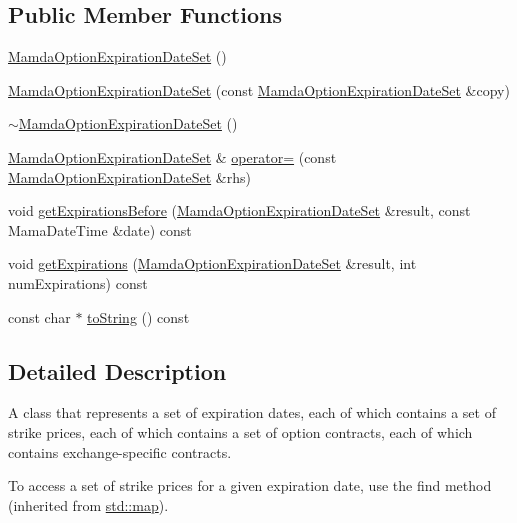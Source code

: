\subsection*{Public Member Functions}
\begin{CompactItemize}
\item 
\hyperlink{classWombat_1_1MamdaOptionExpirationDateSet_d4d423540db1d29fef11c563b451dc69}{Mamda\-Option\-Expiration\-Date\-Set} ()
\item 
\hyperlink{classWombat_1_1MamdaOptionExpirationDateSet_51ec0f5167345aab435049f011d31b4d}{Mamda\-Option\-Expiration\-Date\-Set} (const \hyperlink{classWombat_1_1MamdaOptionExpirationDateSet}{Mamda\-Option\-Expiration\-Date\-Set} \&copy)
\item 
\hyperlink{classWombat_1_1MamdaOptionExpirationDateSet_a912bfba725281fbfb94d9ea33beef74}{$\sim$Mamda\-Option\-Expiration\-Date\-Set} ()
\item 
\hyperlink{classWombat_1_1MamdaOptionExpirationDateSet}{Mamda\-Option\-Expiration\-Date\-Set} \& \hyperlink{classWombat_1_1MamdaOptionExpirationDateSet_44ae713d433431323e784c43f3305e84}{operator=} (const \hyperlink{classWombat_1_1MamdaOptionExpirationDateSet}{Mamda\-Option\-Expiration\-Date\-Set} \&rhs)
\item 
void \hyperlink{classWombat_1_1MamdaOptionExpirationDateSet_a58c1ab06b95af9bbee919d6fe7b373a}{get\-Expirations\-Before} (\hyperlink{classWombat_1_1MamdaOptionExpirationDateSet}{Mamda\-Option\-Expiration\-Date\-Set} \&result, const Mama\-Date\-Time \&date) const 
\item 
void \hyperlink{classWombat_1_1MamdaOptionExpirationDateSet_b756b2efe9defc35104d65ef398d378e}{get\-Expirations} (\hyperlink{classWombat_1_1MamdaOptionExpirationDateSet}{Mamda\-Option\-Expiration\-Date\-Set} \&result, int num\-Expirations) const 
\item 
const char $\ast$ \hyperlink{classWombat_1_1MamdaOptionExpirationDateSet_31ab5b6e52a84706308c7f04c44d702c}{to\-String} () const 
\end{CompactItemize}


\subsection{Detailed Description}
A class that represents a set of expiration dates, each of which contains a set of strike prices, each of which contains a set of option contracts, each of which contains exchange-specific contracts. 

To access a set of strike prices for a given expiration date, use the find method (inherited from \hyperlink{classstd_1_1map}{std::map}). 



